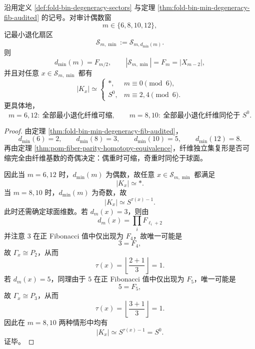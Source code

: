 \begin{theorem}[审计偶数窗口最小退化扇区的拓扑相位]\label{thm:derived-audited-even-minsector-topological-phase}
沿用定义 \ref{def:fold-bin-degeneracy-sectors} 与定理 \ref{thm:fold-bin-min-degeneracy-fib-audited} 的记号。对审计偶数窗
\[
m\in\{6,8,10,12\},
\]
记最小退化扇区
\[
\mathcal S_{m,\min}:=\mathcal S_{m,d_{\min}(m)}.
\]
则
\[
d_{\min}(m)=F_{m/2},
\qquad
|\mathcal S_{m,\min}|=F_m=|X_{m-2}|,
\]
并且对任意 \(x\in \mathcal S_{m,\min}\) 都有
\[
|K_x|\simeq
\begin{cases}
\ast, & m\equiv 0\pmod 6,\\[4pt]
S^0, & m\equiv 2,4\pmod 6.
\end{cases}
\]
更具体地，
\[
m=6,12:\ \text{全部最小退化纤维可缩},
\qquad
m=8,10:\ \text{全部最小退化纤维同伦于 }S^0.
\]
\end{theorem}
\begin{proof}
由定理 \ref{thm:fold-bin-min-degeneracy-fib-audited}，
\[
d_{\min}(6)=2,\qquad d_{\min}(8)=3,\qquad d_{\min}(10)=5,\qquad d_{\min}(12)=8.
\]
再由定理 \ref{thm:pom-fiber-parity-homotopy-equivalence}，纤维独立集复形是否可缩完全由纤维基数的奇偶决定：偶重时可缩，奇重时同伦于球面。

因此当 \(m=6,12\) 时，\(d_{\min}(m)\) 为偶数，故任意
\(
x\in \mathcal S_{m,\min}
\)
都满足
\[
|K_x|\simeq \ast.
\]
当 \(m=8,10\) 时，\(d_{\min}(m)\) 为奇数，故
\[
|K_x|\simeq S^{\tau(x)-1}.
\]
此时还需确定球面维数。若 \(d_m(x)=3\)，则由
\[
d_m(x)=\prod_i F_{\ell_i+2}
\]
并注意 \(3\) 在正 Fibonacci 值中仅出现为 \(F_4\)，故唯一可能是
\[
3=F_4,
\]
故 \(\Gamma_x\cong P_2\)，从而
\[
\tau(x)=\left\lfloor\frac{2+1}{3}\right\rfloor=1.
\]
若 \(d_m(x)=5\)，同理由于 \(5\) 在正 Fibonacci 值中仅出现为 \(F_5\)，唯一可能是
\[
5=F_5,
\]
故 \(\Gamma_x\cong P_3\)，从而
\[
\tau(x)=\left\lfloor\frac{3+1}{3}\right\rfloor=1.
\]
因此在 \(m=8,10\) 两种情形中均有
\[
|K_x|\simeq S^{\tau(x)-1}=S^0.
\]
证毕。
\end{proof}

